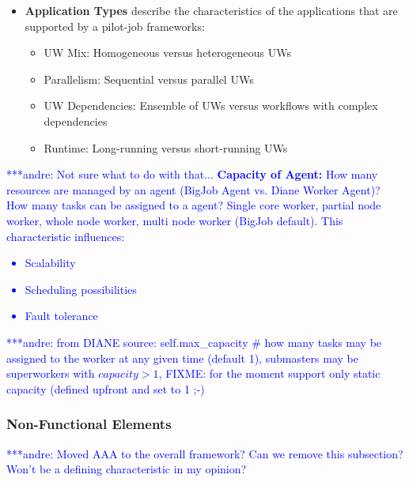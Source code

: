 \documentclass[conference,final]{IEEEtran}
\newcommand{\jhanote}[1]{ {\textcolor{red} { ***shantenu: #1 }}}
\newcommand{\alnote}[1]{ {\textcolor{blue} { ***andre: #1 }}}
\newcommand{\alnote}[1]{}
\newcommand{\jhanote}[1]{}
\begin{document}
\begin{itemize}
\item \textbf{Application Types} describe the characteristics of the 
applications that are supported by a pilot-job frameworks:
\begin{itemize}
    \item UW Mix: Homogeneous versus heterogeneous UWs
    \item Parallelism: Sequential versus parallel UWs
    \item UW Dependencies: Ensemble of UWs versus workflows with complex 
    dependencies
    \item Runtime: Long-running versus short-running UWs
\end{itemize}
\end{itemize}

\alnote{Not sure what to do with that...
\textbf{Capacity of Agent:} How many resources are managed by an agent (BigJob Agent vs. Diane Worker Agent)? How many tasks can be assigned to a agent? Single core worker, partial node worker, whole node worker, multi node worker (BigJob
default). This characteristic influences: 
    \begin{itemize}
        \item Scalability
        \item Scheduling possibilities
        \item Fault tolerance
    \end{itemize}
    \alnote{from DIANE source: self.max\_capacity \# how many tasks may be 
    assigned to the worker at any given time (default 1), submasters may be 
    superworkers with $capacity>1$, FIXME: for the moment support only static 
    capacity (defined upfront and set to 1 ;-)}    
}






\subsubsection{Non-Functional Elements}

\alnote{Moved AAA to the overall framework? Can we remove this subsection? Won't be a defining characteristic in my opinion?}
\end{document}
